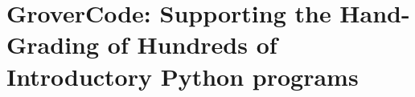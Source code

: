 \chapter{GroverCode: Supporting the Hand-Grading of Hundreds of Introductory Python programs}\label{chapter:grovercode}

